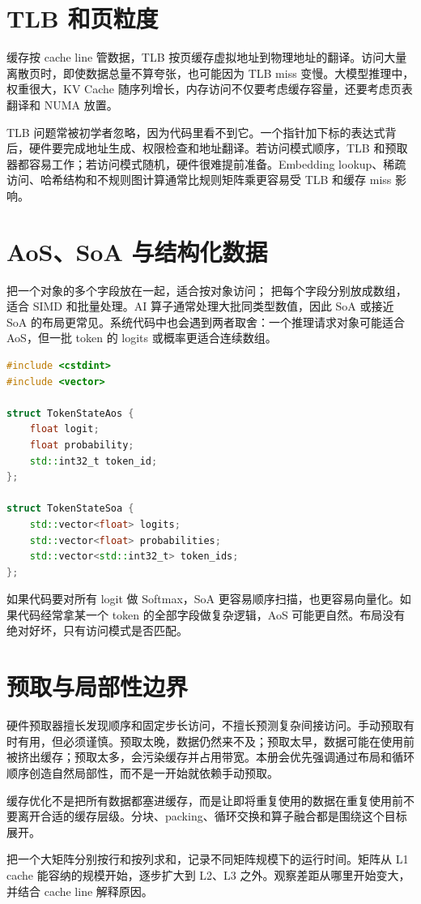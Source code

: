 \section{TLB 和页粒度}

缓存按 cache line 管数据，TLB 按页缓存虚拟地址到物理地址的翻译。访问大量离散页时，即使数据总量不算夸张，也可能因为 TLB miss 变慢。大模型推理中，权重很大，KV Cache 随序列增长，内存访问不仅要考虑缓存容量，还要考虑页表翻译和 NUMA 放置。

TLB 问题常被初学者忽略，因为代码里看不到它。一个指针加下标的表达式背后，硬件要完成地址生成、权限检查和地址翻译。若访问模式顺序，TLB 和预取器都容易工作；若访问模式随机，硬件很难提前准备。Embedding lookup、稀疏访问、哈希结构和不规则图计算通常比规则矩阵乘更容易受 TLB 和缓存 miss 影响。

\section{AoS、SoA 与结构化数据}

 把一个对象的多个字段放在一起，适合按对象访问； 把每个字段分别放成数组，适合 SIMD 和批量处理。AI 算子通常处理大批同类型数值，因此 SoA 或接近 SoA 的布局更常见。系统代码中也会遇到两者取舍：一个推理请求对象可能适合 AoS，但一批 token 的 logits 或概率更适合连续数组。

\begin{lstlisting}[language=C++,caption={AoS 和 SoA 的访问形状}]
#include <cstdint>
#include <vector>

struct TokenStateAos {
    float logit;
    float probability;
    std::int32_t token_id;
};

struct TokenStateSoa {
    std::vector<float> logits;
    std::vector<float> probabilities;
    std::vector<std::int32_t> token_ids;
};
\end{lstlisting}

如果代码要对所有 logit 做 Softmax，SoA 更容易顺序扫描，也更容易向量化。如果代码经常拿某一个 token 的全部字段做复杂逻辑，AoS 可能更自然。布局没有绝对好坏，只有访问模式是否匹配。

\section{预取与局部性边界}

硬件预取器擅长发现顺序和固定步长访问，不擅长预测复杂间接访问。手动预取有时有用，但必须谨慎。预取太晚，数据仍然来不及；预取太早，数据可能在使用前被挤出缓存；预取太多，会污染缓存并占用带宽。本册会优先强调通过布局和循环顺序创造自然局部性，而不是一开始就依赖手动预取。

\begin{keyidea}
缓存优化不是把所有数据都塞进缓存，而是让即将重复使用的数据在重复使用前不要离开合适的缓存层级。分块、packing、循环交换和算子融合都是围绕这个目标展开。
\end{keyidea}

\begin{exercisebox}
把一个大矩阵分别按行和按列求和，记录不同矩阵规模下的运行时间。矩阵从 L1 cache 能容纳的规模开始，逐步扩大到 L2、L3 之外。观察差距从哪里开始变大，并结合 cache line 解释原因。
\end{exercisebox}
